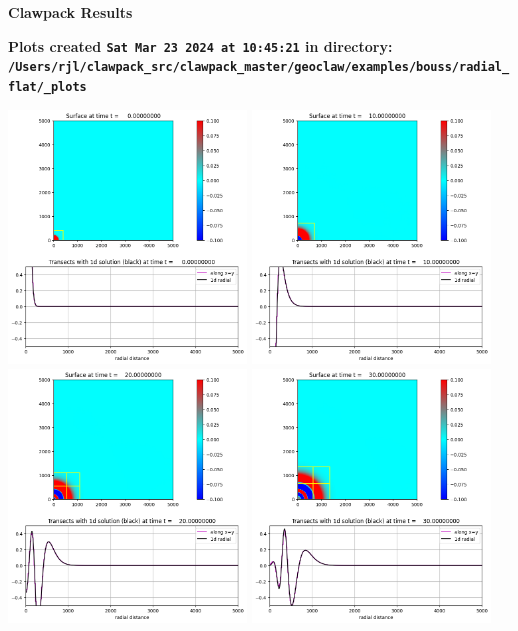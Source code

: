 \documentclass[11pt]{article}
\begin{document}
        \begin{center}{\Large\bf Clawpack Results}\vskip 5pt
        
        \bf Plots created {\tt Sat Mar 23 2024 at 10:45:21} in directory: \vskip 5pt
        \verb+/Users/rjl/clawpack_src/clawpack_master/geoclaw/examples/bouss/radial_flat/_plots+
        \end{center}
        \vskip 5pt
        \includegraphics[width=0.475\textwidth]{frame0000fig20.png}
\vskip 10pt 
\includegraphics[width=0.475\textwidth]{frame0001fig20.png}
\vskip 10pt 
\includegraphics[width=0.475\textwidth]{frame0002fig20.png}
\vskip 10pt 
\includegraphics[width=0.475\textwidth]{frame0003fig20.png}
\end{document}
